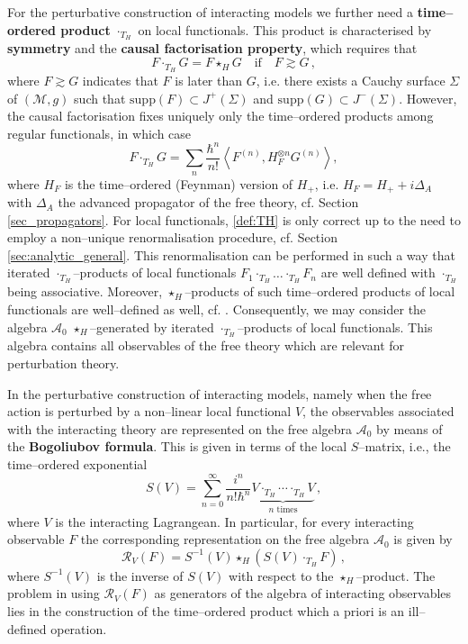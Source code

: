 \documentclass[a4paper,10pt,twoside]{article}
\numberwithin{equation}{section}
\newcounter{and}
\def\M{\mathcal{M}}
\def\A{\mathcal{A}}
\def\supp{\mathrm{supp}}
\def\beq{\begin{equation}}
\def\eeq{\end{equation}}
\theoremstyle{plain}
\theoremstyle{definition}
\begin{document}
For the perturbative construction of interacting models we further need a {\bf time--ordered product} $\cdot_{T_H}$ on local functionals. This product is characterised by {\bf symmetry} and the {\bf causal factorisation property}, which requires that 
\begin{equation}\label{eq:causal-factorisation}
F\cdot_{T_H} G =  F\star_H G\quad    \text{if}\quad F\gtrsim G\,,
\end{equation}
where $F \gtrsim G$ indicates that $F$ is later than $G$, i.e. there exists a Cauchy surface $\Sigma$ of $(\M,g)$ such that $\supp(F) \subset J^+(\Sigma)$ and $\supp(G) \subset J^-(\Sigma)$. However, the causal factorisation fixes uniquely only the time--ordered products among regular functionals, in which case
\beq\label{def:TH}
F \cdot_{T_H}  G =  \sum_n \frac{\hbar^n}{n!}\left\langle F^{(n)}, H_F^{\otimes n} G^{(n)} \right\rangle,
\eeq
where $H_F$ is the time--ordered (Feynman) version of $H_+$, i.e. $H_F=H_++i\Delta_A$ with $\Delta_A$ the advanced propagator of the free theory, cf. Section \ref{sec_propagators}. For local functionals, \eqref{def:TH} is only correct up to the need to employ a non--unique renormalisation procedure, cf. Section \ref{sec:analytic_general}. This renormalisation can be performed in such a way that iterated $\cdot_{T_H}$--products of local functionals $F_1 \cdot_{T_H} \dots \cdot_{T_H} F_n$ are well defined with $\cdot_{T_H}$ being associative. Moreover, $\star_H$--products of such time--ordered products of local functionals are well--defined as well, cf. \cite{Hollands:2001b, BDF,FredenhagenRejzner,FredenhagenRejzner2}. Consequently, we may consider the algebra $\A_0$ $\star_H$--generated by iterated $\cdot_{T_H}$--products of local functionals. This algebra contains all observables of the free theory which are relevant for perturbation theory.

In the perturbative construction of interacting models, namely when the free action is perturbed by a non--linear local functional $V$, the observables associated with the interacting theory are represented on the free algebra $\A_0$ by means of the {\bf Bogoliubov formula}. This is given in terms of the local $S$--matrix, i.e., the time--ordered exponential
%
\beq\label{def:Smatrix}
S(V)=\sum^\infty_{n=0}\frac{i^n}{n!\hbar^n}\underbrace{V\cdot_{T_H} \cdots \cdot_{T_H} V}_{n \text{ times}}\,,
\eeq
%
where $V$ is the interacting Lagrangean.  In particular, for every interacting observable $F$ the corresponding representation on the free algebra $\A_0$ is given by
\begin{equation}\label{eq:bogoliubov}
\mathcal{R}_V(F) = S^{-1}(V)\star_H \left(  S(V)\cdot_{T_H} F \right)\,, 
\end{equation}
where $S^{-1}(V)$ is the inverse of $S(V)$ with respect to the $\star_H$--product. The problem in using $\mathcal{R}_V(F)$ as generators of the algebra of interacting observables lies in the construction of the time--ordered product which a priori is an ill--defined operation.
\end{document}
